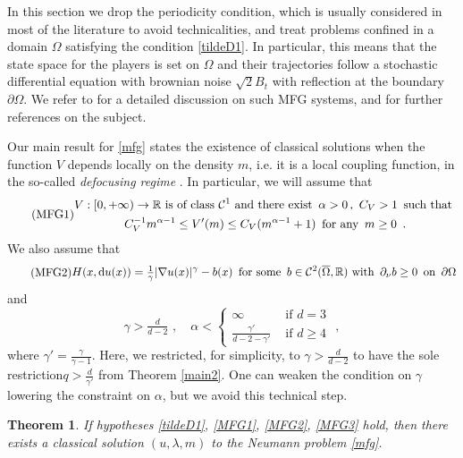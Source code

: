 \documentclass[10pt, a4paper, reqno, oneside]{amsart}
\theoremstyle{plain}
\theoremstyle{definition}
\theoremstyle{plain}
\newtheorem{theorem}[theo]{Theorem}
\theoremstyle{definition}
\theoremstyle{plain}
\renewcommand{\=}{:=}
\begin{document}
In this section we drop the periodicity condition, which is usually considered in most of the literature to avoid technicalities, and treat problems confined in a domain $\Omega$ satisfying the condition \eqref{tildeD1}. In particular, this means that the state space for the players is set on $\Omega$ and their trajectories follow a stochastic differential equation with brownian noise $\sqrt{2}B_t$ with reflection at the boundary $\partial\Omega$. We refer to \cite{CirantJMPA,Alpar} for a detailed discussion on such MFG systems, and for further references on the subject.

Our main result for \eqref{mfg} states the existence of classical solutions when the function $V$ depends locally on the density $m$, i.e. it is a local coupling function, in the so-called {\it defocusing regime} \cite{CCPDE}. In particular, we will assume that
\begin{equation} \label{MFG1} \tag{MFG1}
\begin{gathered}
\text{$V: [0,+\infty) \to \mathbb{R}$ is of class $\mathcal{C}^1$ and there exist \,$\alpha>0$\,, \,$C_V>1$\, such that } \\
\text{$C_V^{-1} m^{\alpha-1} \leq V'(m) \leq C_V (m^{\alpha-1}+1)$\, for any \,$m \geq 0$\, .}
\end{gathered} \end{equation}
We also assume that
\begin{equation} \label{MFG2} \tag{MFG2}
\begin{gathered}
\text{$H(x,{\rm d}u(x))=\tfrac1{\gamma} |\nabla u(x)|^\gamma-b(x)$\, for some \,$b \in \mathcal{C}^2(\overline{\Omega},\mathbb{R})$ with \,$\partial_\nu b \geq 0$\, on \,$\partial\Omega$}
\end{gathered} \end{equation}
and 
\begin{equation} \label{MFG3} \tag{MFG3}
\gamma>\tfrac{d}{d-2} \,\, , \quad \alpha<\begin{cases}
\infty&\text{ if }d=3\\
\tfrac{\gamma'}{d-2-\gamma'}&\text{ if }d\geq 4
\end{cases} \,\, ,
\end{equation}
where $\gamma' = \tfrac{\gamma}{\gamma-1}$. Here, we restricted, for simplicity, to $\gamma>\tfrac{d}{d-2}$ to have the sole restriction$ q>\frac{d}{\gamma'}$ from Theorem \ref{main2}. One can weaken the condition on $\gamma$ lowering the constraint on $\alpha$, but we avoid this technical step.

\begin{theorem} \label{mainappl}
If hypotheses \eqref{tildeD1}, \eqref{MFG1}, \eqref{MFG2}, \eqref{MFG3} hold, then there exists a classical solution $(u,\lambda,m)$ to the Neumann problem \eqref{mfg}.
\end{theorem}
\end{document}
